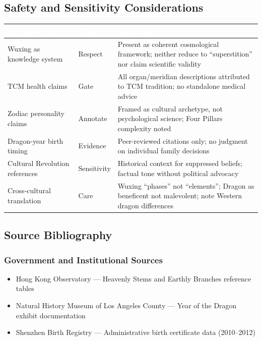 \documentclass[11pt,letterpaper]{article}
\newcommand{\tableheader}[1]{\textbf{\sffamily\textcolor{white}{#1}}}
\begin{document}
\subsection{Safety and Sensitivity Considerations}

\begin{center}
\begin{tabularx}{\textwidth}{L{3.5cm}L{2cm}X}
\toprule
{}
\tableheader{Consideration} & \tableheader{Type} & \tableheader{Handling} \\
\midrule
Wuxing as knowledge system & Respect & Present as coherent cosmological framework; neither reduce to ``superstition'' nor claim scientific validity \\
TCM health claims & Gate & All organ/meridian descriptions attributed to TCM tradition; no standalone medical advice \\
Zodiac personality claims & Annotate & Framed as cultural archetype, not psychological science; Four Pillars complexity noted \\
Dragon-year birth timing & Evidence & Peer-reviewed citations only; no judgment on individual family decisions \\
Cultural Revolution references & Sensitivity & Historical context for suppressed beliefs; factual tone without political advocacy \\
Cross-cultural translation & Care & Wuxing ``phases'' not ``elements''; Dragon as beneficent not malevolent; note Western dragon differences \\
\bottomrule
\end{tabularx}
\end{center}

\subsection{Source Bibliography}

\subsubsection{Government and Institutional Sources}
\begin{itemize}[leftmargin=2em]
\item Hong Kong Observatory --- Heavenly Stems and Earthly Branches reference tables
\item Natural History Museum of Los Angeles County --- Year of the Dragon exhibit documentation
\item Shenzhen Birth Registry --- Administrative birth certificate data (2010--2012)
\end{itemize}
\end{document}
